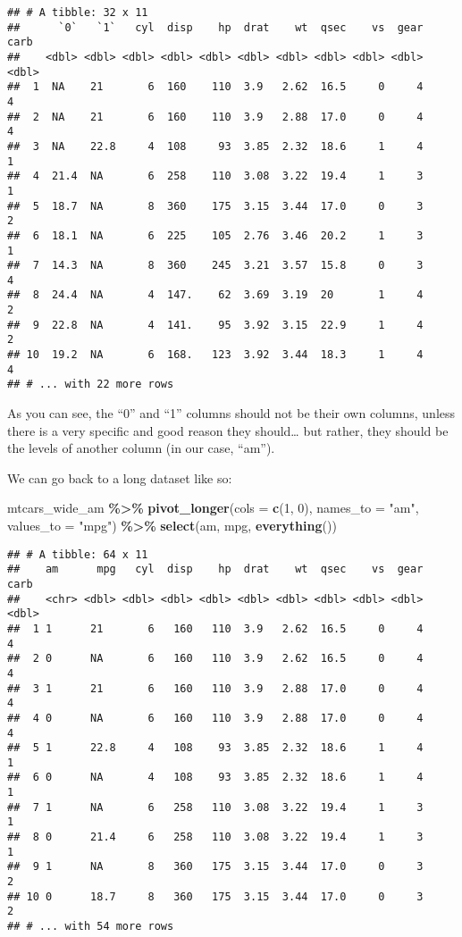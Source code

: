 \documentclass[
]{article}
\newenvironment{Shaded}{\begin{snugshade}}{\end{snugshade}}
\newcommand{\DataTypeTok}[1]{\textcolor[rgb]{0.13,0.29,0.53}{#1}}
\newcommand{\KeywordTok}[1]{\textcolor[rgb]{0.13,0.29,0.53}{\textbf{#1}}}
\newcommand{\NormalTok}[1]{#1}
\newcommand{\OperatorTok}[1]{\textcolor[rgb]{0.81,0.36,0.00}{\textbf{#1}}}
\newcommand{\StringTok}[1]{\textcolor[rgb]{0.31,0.60,0.02}{#1}}
\begin{document}
\begin{verbatim}
## # A tibble: 32 x 11
##      `0`   `1`   cyl  disp    hp  drat    wt  qsec    vs  gear  carb
##    <dbl> <dbl> <dbl> <dbl> <dbl> <dbl> <dbl> <dbl> <dbl> <dbl> <dbl>
##  1  NA    21       6  160    110  3.9   2.62  16.5     0     4     4
##  2  NA    21       6  160    110  3.9   2.88  17.0     0     4     4
##  3  NA    22.8     4  108     93  3.85  2.32  18.6     1     4     1
##  4  21.4  NA       6  258    110  3.08  3.22  19.4     1     3     1
##  5  18.7  NA       8  360    175  3.15  3.44  17.0     0     3     2
##  6  18.1  NA       6  225    105  2.76  3.46  20.2     1     3     1
##  7  14.3  NA       8  360    245  3.21  3.57  15.8     0     3     4
##  8  24.4  NA       4  147.    62  3.69  3.19  20       1     4     2
##  9  22.8  NA       4  141.    95  3.92  3.15  22.9     1     4     2
## 10  19.2  NA       6  168.   123  3.92  3.44  18.3     1     4     4
## # ... with 22 more rows
\end{verbatim}

As you can see, the ``0'' and ``1'' columns should not be their own columns, unless there is a very
specific and good reason they should\ldots{} but rather, they should be the levels of another column (in
our case, ``am'').

We can go back to a long dataset like so:

\begin{Shaded}
\begin{Highlighting}[]
\NormalTok{mtcars\_wide\_am }\OperatorTok{\%\textgreater{}\%}\StringTok{ }
\StringTok{  }\KeywordTok{pivot\_longer}\NormalTok{(}\DataTypeTok{cols =} \KeywordTok{c}\NormalTok{(}\StringTok{\textasciigrave{}}\DataTypeTok{1}\StringTok{\textasciigrave{}}\NormalTok{, }\StringTok{\textasciigrave{}}\DataTypeTok{0}\StringTok{\textasciigrave{}}\NormalTok{), }\DataTypeTok{names\_to =} \StringTok{"am"}\NormalTok{, }\DataTypeTok{values\_to =} \StringTok{"mpg"}\NormalTok{) }\OperatorTok{\%\textgreater{}\%}\StringTok{ }
\StringTok{  }\KeywordTok{select}\NormalTok{(am, mpg, }\KeywordTok{everything}\NormalTok{())}
\end{Highlighting}
\end{Shaded}

\begin{verbatim}
## # A tibble: 64 x 11
##    am      mpg   cyl  disp    hp  drat    wt  qsec    vs  gear  carb
##    <chr> <dbl> <dbl> <dbl> <dbl> <dbl> <dbl> <dbl> <dbl> <dbl> <dbl>
##  1 1      21       6   160   110  3.9   2.62  16.5     0     4     4
##  2 0      NA       6   160   110  3.9   2.62  16.5     0     4     4
##  3 1      21       6   160   110  3.9   2.88  17.0     0     4     4
##  4 0      NA       6   160   110  3.9   2.88  17.0     0     4     4
##  5 1      22.8     4   108    93  3.85  2.32  18.6     1     4     1
##  6 0      NA       4   108    93  3.85  2.32  18.6     1     4     1
##  7 1      NA       6   258   110  3.08  3.22  19.4     1     3     1
##  8 0      21.4     6   258   110  3.08  3.22  19.4     1     3     1
##  9 1      NA       8   360   175  3.15  3.44  17.0     0     3     2
## 10 0      18.7     8   360   175  3.15  3.44  17.0     0     3     2
## # ... with 54 more rows
\end{verbatim}
\end{document}

